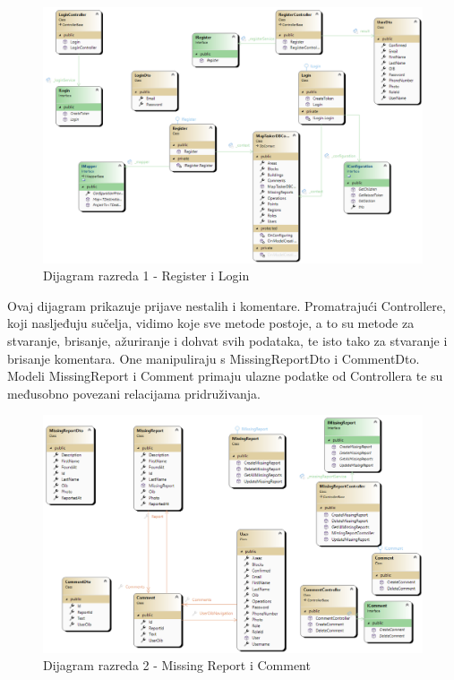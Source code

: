 			\begin{figure}[H] \includegraphics[width=\linewidth]{dijagrami/CD-LoginRegister.png}
				\caption{Dijagram razreda 1 - Register i Login}
			\end{figure}
		
		\eject
		
		Ovaj dijagram prikazuje prijave nestalih i komentare. Promatrajući Controllere, koji nasljeđuju sučelja, vidimo koje sve metode postoje, a to su metode za stvaranje, brisanje, ažuriranje i dohvat svih podataka, te isto tako za stvaranje i brisanje komentara. One manipuliraju s MissingReportDto i CommentDto. Modeli MissingReport i Comment primaju ulazne podatke od Controllera te su međusobno povezani relacijama pridruživanja.
		
			\begin{figure}[h!] \includegraphics[width=\linewidth]{dijagrami/CD-CommentMissingReport.png}
				\caption{Dijagram razreda 2 - Missing Report i Comment}
			\end{figure}
		

